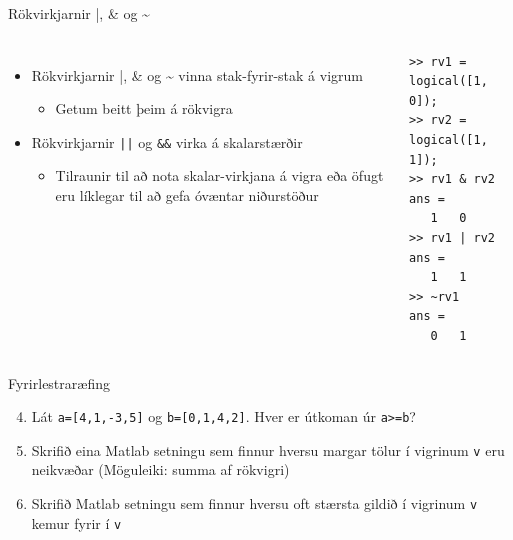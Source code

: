 \documentclass[handout]{beamer}
\begin{document}
\begin{frame}[fragile]{Rökvirkjarnir |, \& og \~{}}
\vspace{\baselineskip}
\begin{columns}
\begin{itemize}
 \item Rökvirkjarnir |, \& og \~{} vinna stak-fyrir-stak á vigrum
 \begin{itemize}
  \item Getum beitt þeim á rökvigra
 \end{itemize}
 \item Rökvirkjarnir \texttt{||} og \texttt{\&\&} virka á skalarstærðir
 \begin{itemize}
  \item Tilraunir til að nota skalar-virkjana á vigra eða öfugt eru líklegar til að gefa óvæntar niðurstöður
 \end{itemize}
\end{itemize}
\begin{verbatim}
>> rv1 = logical([1, 0]);
>> rv2 = logical([1, 1]);
>> rv1 & rv2
ans =
   1   0
>> rv1 | rv2
ans =
   1   1
>> ~rv1
ans =
   0   1
\end{verbatim}
\end{columns}
\end{frame}

\begin{frame}{Fyrirlestraræfing}
    \begin{enumerate}
        \setcounter{enumi}{3}
         \item Lát  \texttt{a=[4,1,-3,5]}  og   \texttt{b=[0,1,4,2]}. Hver er útkoman úr  \texttt{a>=b}?
         \item Skrifið eina Matlab setningu sem finnur hversu margar tölur í vigrinum \texttt{v} eru neikvæðar (Möguleiki: summa af rökvigri)
         \item Skrifið Matlab setningu sem finnur hversu oft stærsta gildið í vigrinum \texttt{v} kemur fyrir í \texttt{v}
    \end{enumerate}
\end{frame}
\end{document}
